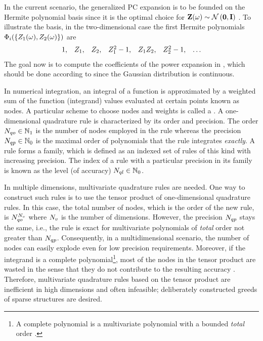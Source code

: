 In the current scenario, the generalized PC expansion is to be founded on the Hermite polynomial basis since it is the optimal choice for $\vZ(\o) \sim \normal{\vZero}{\mI}$ \cite{xiu2002}. To illustrate the basis, in the two-dimensional case the first Hermite polynomials $\Phi_i(\{ Z_1(\omega), Z_2(\omega) \})$ are
\[
  \begin{array}{lllllll}
  1, & Z_1, & Z_2, & Z_1^2 - 1, & Z_1 Z_2, & Z_2^2 - 1, & \dotsc
  \end{array}
\]
The goal now is to compute the coefficients of the power expansion in , which should be done according to  since the Gaussian distribution is continuous.

In numerical integration, an integral of a function is approximated by a weighted sum of the function (integrand) values evaluated at certain points known as nodes. A particular scheme to choose nodes and weights is called a . A one-dimensional quadrature rule is characterized by its order and precision. The order $N_{qo} \in \mathbb{N}_{1}$ is the number of nodes employed in the rule whereas the precision $N_{qp} \in \mathbb{N}_{0}$ is the maximal order of polynomials that the rule integrates \emph{exactly}. A rule forms a family, which is defined as an indexed set of rules of this kind with increasing precision. The index of a rule with a particular precision in its family is known as the level (of accuracy) $N_{ql} \in \mathbb{N}_{0}$.

In multiple dimensions, multivariate quadrature rules are needed. One way to construct such rules is to use the tensor product of one-dimensional quadrature rules. In this case, the total number of nodes, which is the order of the new rule, is $N_{qo}^{N_v}$ where ${N_v}$ is the number of dimensions. However, the precision $N_{qp}$ stays the same, i.e., the rule is exact for multivariate polynomials of \emph{total} order not greater than $N_{qp}$. Consequently, in a multidimensional scenario, the number of nodes can easily explode even for low precision requirements. Moreover, if the integrand is a complete polynomial\footnote{A complete polynomial is a multivariate polynomial with a bounded \emph{total} order \cite{heiss2008}.}, most of the nodes in the tensor product are wasted in the sense that they do not contribute to the resulting accuracy \cite{heiss2008}. Therefore, multivariate quadrature rules based on the tensor product are inefficient in high dimensions and often infeasible; deliberately constructed greeds of sparse structures are desired.

